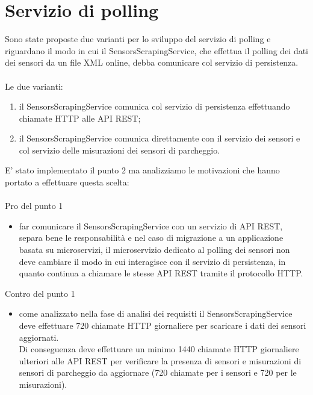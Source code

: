 \section{Servizio di polling}
Sono state proposte due varianti per lo sviluppo del servizio di polling e riguardano il
modo in cui il SensorsScrapingService, che effettua il polling dei dati dei sensori
da un file \gls{XML} online, debba comunicare col servizio di persistenza.
\\\\
Le due varianti:
\begin{enumerate}
    \item il SensorsScrapingService comunica col servizio di persistenza effettuando chiamate \gls{HTTP} 
        alle \gls{API} \gls{REST};
    \item il SensorsScrapingService comunica direttamente con il servizio dei sensori e col servizio delle misurazioni 
        dei sensori di parcheggio.
\end{enumerate}
\leavevmode\newline
E' stato implementato il punto 2 ma analizziamo le motivazioni che hanno portato a effettuare questa scelta:
\\\\
Pro del punto 1
\begin{itemize}
    \item far comunicare il SensorsScrapingService con un servizio di \gls{API} \gls{REST}, separa bene le responsabilità e 
        nel caso di migrazione a un applicazione basata su microservizi, il microservizio dedicato al polling dei sensori 
        non deve cambiare il modo in cui interagisce
        con il servizio di persistenza, in quanto continua a chiamare le stesse \gls{API} \gls{REST} tramite il protocollo \gls{HTTP}.
\end{itemize}
\leavevmode\newline
Contro del punto 1
\begin{itemize}
    \item come analizzato nella fase di analisi dei requisiti il SensorsScrapingService deve effettuare 720 chiamate \gls{HTTP} giornaliere
        per scaricare i dati dei sensori aggiornati. 
        \\
        Di conseguenza deve effettuare un minimo 1440 chiamate \gls{HTTP} giornaliere ulteriori alle \gls{API} \gls{REST} 
        per verificare la presenza di sensori e misurazioni di sensori di parcheggio 
        da aggiornare (720 chiamate per i sensori e 720 per le misurazioni).
\end{itemize}
